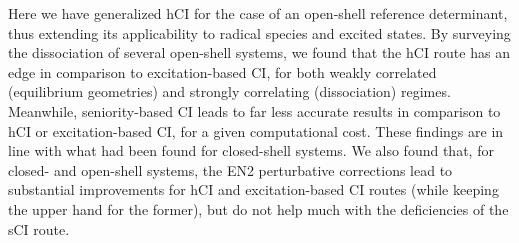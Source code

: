 \documentclass[aip,jcp,reprint,noshowkeys,superscriptaddress]{revtex4-1}
\begin{document}


Here we have generalized hCI \cite{Kossoski_2022} for the case of an open-shell reference determinant, thus extending its applicability to radical species and excited states.
By surveying the dissociation of several open-shell systems, 
we found that the hCI route has an edge in comparison to excitation-based CI, for both weakly correlated (equilibrium geometries) and strongly correlating (dissociation) regimes.
Meanwhile, seniority-based CI leads to far less accurate results in comparison to hCI or excitation-based CI, for a given computational cost.
These findings are in line with what had been found for closed-shell systems. \cite{Kossoski_2022}
We also found that, for closed- and open-shell systems,
the EN2 perturbative corrections lead to substantial improvements for hCI and excitation-based CI routes (while keeping the upper hand for the former), but do not help much with the deficiencies of the sCI route.
\end{document}
